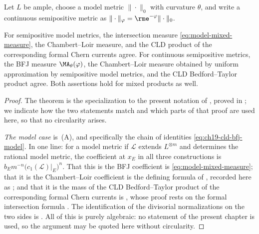 Let $L$ be ample, choose a model metric $\|\cdot\|_0$ with curvature
$\theta$, and write a continuous semipositive metric as
$\|\cdot\|_\varphi=\rme^{-\varphi}\|\cdot\|_0$.

\begin{theorem}\label{thm:bfj-cld-ma-common-locus}
For semipositive model metrics, the intersection measure
\eqref{eq:model-mixed-measure}, the Chambert--Loir measure, and the CLD
product of the corresponding formal Chern currents agree.  For continuous
semipositive metrics, the BFJ measure $\MA_\theta(\varphi)$, the
Chambert--Loir measure obtained by uniform approximation by semipositive
model metrics, and the CLD Bedford--Taylor product agree.  Both assertions
hold for mixed products as well.
\end{theorem}

\begin{proof}
The theorem is the specialization to the present notation of
, proved in ; we
indicate how the two statements match and which parts of that proof are used
here, so that no circularity arises.

\emph{The model case} is
\,(A), and specifically the chain of
identities \eqref{eq:ch19-cld-bfj-model}.  In one line: for a model metric
if $\mathcal L$ extends $L^{\otimes m}$ and determines the rational
model metric, the coefficient at $x_E$ in all three constructions is
$b_Em^{-n}\bigl(c_1(\mathcal L)|_E\bigr)^n$.  That this is the BFJ coefficient is
\eqref{eq:model-mixed-measure}; that it is the Chambert--Loir coefficient is
the defining formula of \cite{CL06}, recorded here as
; and that it is the mass of the CLD
Bedford--Taylor product of the corresponding formal Chern currents is
, whose proof rests on the formal intersection
formula \cite[Theorem~18.5.5 and Proposition~18.5.8]{CLD25}.  The
identification of the divisorial normalizations on the two sides is
.  All of this is purely algebraic: no
statement of the present chapter is used, so the argument may be quoted here
without circularity.


\end{proof}
